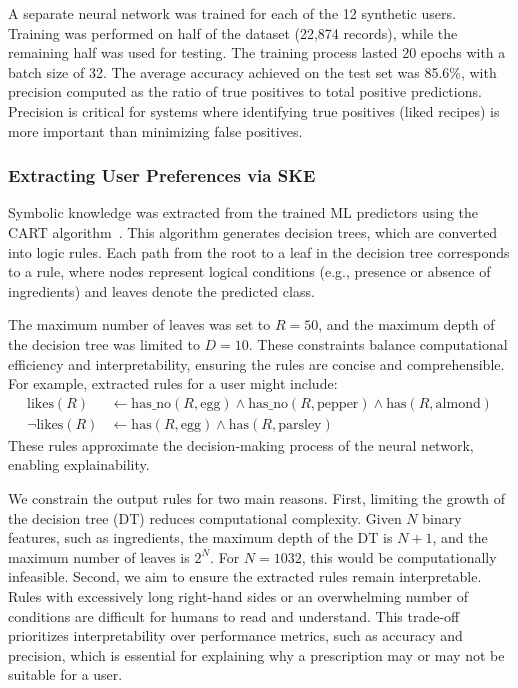 A separate neural network was trained for each of the 12 synthetic users.
%
Training was performed on half of the dataset (22,874 records), while the remaining half was used for testing.
%
The training process lasted 20 epochs with a batch size of 32.
%
The average accuracy achieved on the test set was 85.6\%, with precision computed as the ratio of true positives to total positive predictions.
%
Precision is critical for systems where identifying true positives (liked recipes) is more important than minimizing false positives.

\subsubsection{Extracting User Preferences via \Gls{SKE}}\label{subsubsec:extracting-user-preferences}
%

%
Symbolic knowledge was extracted from the trained \gls{ML} predictors using the CART algorithm~\cite{DBLP:books/wa/BreimanFOS84}.
%
This algorithm generates decision trees, which are converted into logic rules.
%
Each path from the root to a leaf in the decision tree corresponds to a rule, where nodes represent logical conditions (e.g., presence or absence of ingredients) and leaves denote the predicted class.

The maximum number of leaves was set to \( R = 50 \), and the maximum depth of the decision tree was limited to \( D = 10 \).
%
These constraints balance computational efficiency and interpretability, ensuring the rules are concise and comprehensible.
%
For example, extracted rules for a user might include:
%
\begin{align*}
  \text{likes}(R) &\leftarrow \text{has\_no}(R, \text{egg}) \land \text{has\_no}(R, \text{pepper}) \land \text{has}(R, \text{almond}) \\
  \neg \text{likes}(R) &\leftarrow \text{has}(R, \text{egg}) \land \text{has}(R, \text{parsley})
\end{align*}
%
These rules approximate the decision-making process of the neural network, enabling explainability.

We constrain the output rules for two main reasons.
%
First, limiting the growth of the decision tree (\gls{DT}) reduces computational complexity.
%
Given \(N\) binary features, such as ingredients, the maximum depth of the \gls{DT} is \(N + 1\), and the maximum number of leaves is \(2^N\).
%
For \(N = 1032\), this would be computationally infeasible.
%
Second, we aim to ensure the extracted rules remain interpretable.
%
Rules with excessively long right-hand sides or an overwhelming number of conditions are difficult for humans to read and understand.
%
This trade-off prioritizes interpretability over performance metrics, such as accuracy and precision, which is essential for explaining why a prescription may or may not be suitable for a user.


